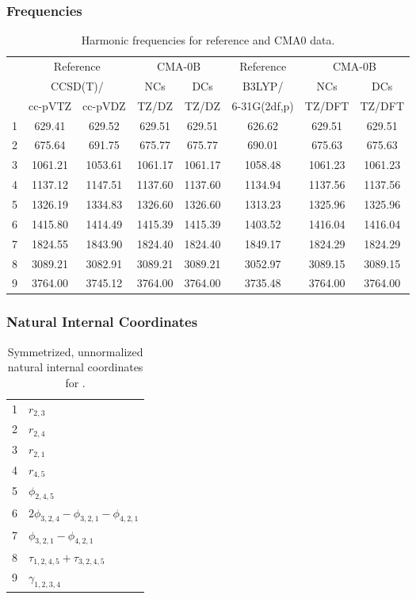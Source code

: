 \documentclass[10pt,oneside]{article}
\begin{document}
\subsubsection*{Frequencies}
\begin{table}[h!]
\centering
\caption{Harmonic frequencies for reference and CMA0 data.}
\begin{tabular}{cccccccc}
\toprule
{} & \multicolumn{2}{c}{Reference} & \multicolumn{2}{c}{CMA-0B} &    Reference & \multicolumn{2}{c}{CMA-0B} \\
{} & \multicolumn{2}{c}{CCSD(T)/} &     NCs &     DCs &       B3LYP/ &     NCs &     DCs \\
{} &   cc-pVTZ & cc-pVDZ &   TZ/DZ &   TZ/DZ & 6-31G(2df,p) &  TZ/DFT &  TZ/DFT \\
\midrule
1 &    629.41 &  629.52 &  629.51 &  629.51 &       626.62 &  629.51 &  629.51 \\
2 &    675.64 &  691.75 &  675.77 &  675.77 &       690.01 &  675.63 &  675.63 \\
3 &   1061.21 & 1053.61 & 1061.17 & 1061.17 &      1058.48 & 1061.23 & 1061.23 \\
4 &   1137.12 & 1147.51 & 1137.60 & 1137.60 &      1134.94 & 1137.56 & 1137.56 \\
5 &   1326.19 & 1334.83 & 1326.60 & 1326.60 &      1313.23 & 1325.96 & 1325.96 \\
6 &   1415.80 & 1414.49 & 1415.39 & 1415.39 &      1403.52 & 1416.04 & 1416.04 \\
7 &   1824.55 & 1843.90 & 1824.40 & 1824.40 &      1849.17 & 1824.29 & 1824.29 \\
8 &   3089.21 & 3082.91 & 3089.21 & 3089.21 &      3052.97 & 3089.15 & 3089.15 \\
9 &   3764.00 & 3745.12 & 3764.00 & 3764.00 &      3735.48 & 3764.00 & 3764.00 \\
\bottomrule
\end{tabular}
\end{table}

\clearpage

\subsubsection*{Natural Internal Coordinates}
\begin{table}[h!]
\centering
\caption{Symmetrized, unnormalized natural internal coordinates for .}
\small
\begin{tabular}{ll}
  1   & $r_{2,3}$ \\
  2   & $r_{2,4}$ \\
  3   & $r_{2,1}$ \\
  4   & $r_{4,5}$ \\
  5   & $\phi_{2,4,5}$ \\
  6   & $2\phi_{3,2,4} - \phi_{3,2,1} - \phi_{4,2,1}$ \\
  7   & $\phi_{3,2,1} - \phi_{4,2,1}$ \\
  8   & $\tau_{1,2,4,5} + \tau_{3,2,4,5}$ \\
  9   & $\gamma_{1,2,3,4}$ \\
\end{tabular}
\end{table}
\end{document}
